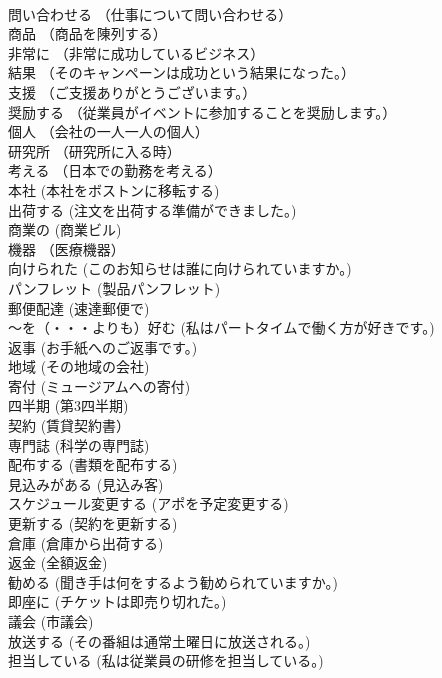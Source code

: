 \documentclass[8pt]{extreport}
\begin{document}
\begin{CJK}{UTF8}{min}
\\	問い合わせる	（仕事について問い合わせる）		
\\	商品	（商品を陳列する）		
\\	非常に	（非常に成功しているビジネス）		
\\	結果	（そのキャンペーンは成功という結果になった。）		
\\	支援	（ご支援ありがとうございます。）		
\\	奨励する	（従業員がイベントに参加することを奨励します。）		
\\	個人	（会社の一人一人の個人）		
\\	研究所	（研究所に入る時）		
\\	考える	（日本での勤務を考える）		
\\	本社	(本社をボストンに移転する)		
\\	出荷する	(注文を出荷する準備ができました。)		
\\	商業の	(商業ビル)		
\\	機器	（医療機器）		
\\	向けられた	(このお知らせは誰に向けられていますか。)		
\\	パンフレット	(製品パンフレット)		
\\	郵便配達	(速達郵便で)		
\\	～を（・・・よりも）好む	(私はパートタイムで働く方が好きです。)		
\\	返事	(お手紙へのご返事です。)		
\\	地域	(その地域の会社)		
\\	寄付	(ミュージアムへの寄付)		
\\	四半期	(第3四半期)		
\\	契約	(賃貸契約書）		
\\	専門誌	(科学の専門誌)		
\\	配布する	(書類を配布する)		
\\	見込みがある	(見込み客)		
\\	スケジュール変更する	(アポを予定変更する)		
\\	更新する	(契約を更新する)		
\\	倉庫	(倉庫から出荷する)		
\\	返金	(全額返金)		
\\	勧める	(聞き手は何をするよう勧められていますか。)		
\\	即座に	(チケットは即売り切れた。)		
\\	議会	(市議会)		
\\	放送する	(その番組は通常土曜日に放送される。)		
\\	担当している	(私は従業員の研修を担当している。)		

\end{CJK}
\end{document}
